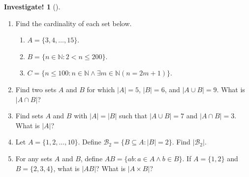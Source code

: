 \documentclass[10pt,]{book}
\theoremstyle{plain}
\theoremstyle{definition}
\theoremstyle{definition}
\theoremstyle{definition}
\newtheorem{investigation}[project]{Investigate!}
\theoremstyle{definition}
\numberwithin{equation}{chapter}
\def\N{\mathbb N}
\def\st{:}
\newcommand{\lt}{<}
\begin{document}
\begin{investigation}[]\label{investigation-12}
\hypertarget{p-1475}{}%
%
\begin{enumerate}
\item\hypertarget{li-432}{}\hypertarget{p-1476}{}%
Find the cardinality of each set below. %
\begin{enumerate}
\item\hypertarget{li-433}{}\(A = \{3,4,\ldots, 15\}\).%
\item\hypertarget{li-434}{}\(B = \{n \in \N \st 2 \lt  n \le 200\}\).%
\item\hypertarget{li-435}{}\(C = \{n \le 100 \st n \in \N \wedge \exists m \in \N (n = 2m+1)\}\).%
\end{enumerate}
%
\item\hypertarget{li-436}{}\hypertarget{p-1477}{}%
Find two sets \(A\) and \(B\) for which \(|A| = 5\), \(|B| = 6\), and \(|A\cup B| = 9\). What is \(|A \cap B|\)?%
\item\hypertarget{li-437}{}\hypertarget{p-1478}{}%
Find sets \(A\) and \(B\) with \(|A| = |B|\) such that \(|A\cup B| = 7\) and \(|A \cap B| = 3\). What is \(|A|\)?%
\item\hypertarget{li-438}{}\hypertarget{p-1479}{}%
Let \(A = \{1,2,\ldots, 10\}\). Define \(\mathcal{B}_2 = \{B \subseteq A \st |B| = 2\}\). Find \(|\mathcal{B}_2|\).%
\item\hypertarget{li-439}{}For any sets \(A\) and \(B\), define \(AB = \{ab \st a\in A \wedge b \in B\}\). If \(A = \{1,2\}\) and \(B = \{2,3,4\}\), what is \(|AB|\)? What is \(|A \times B|\)?%
\end{enumerate}
%
\end{investigation}
\typeout{************************************************}
\typeout{************************************************}
\end{document}
